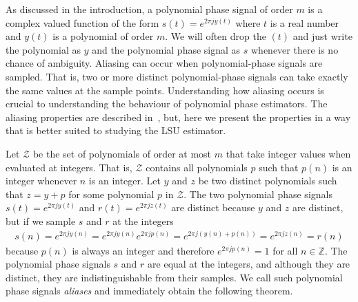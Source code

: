 \documentclass[aap,preprint]{imsart}
\newcommand{\ints}{{\mathbb Z}}
\newcommand{\term}{\emph}
\begin{document}
As discussed in the introduction, a polynomial phase signal of order $m$ is a complex valued function of the form $s(t) = e^{2\pi j y(t)}$ where $t$ is a real number and $y(t)$ is a polynomial of order $m$. We will often drop the $(t)$ and just write the polynomial as $y$ and the polynomial phase signal as $s$ whenever there is no chance of ambiguity. %
Aliasing can occur when polynomial-phase signals are sampled.  That is, two or more distinct polynomial-phase signals can take exactly the same values at the sample points.  Understanding how aliasing occurs is crucial to understanding the behaviour of polynomial phase estimators.  The aliasing properties are described in~\cite{McKilliam2009IndentifiabliltyAliasingPolyphase}, but, here we present the properties in a way that is better suited to studying the LSU estimator.  %

Let $\mathcal{Z}$ be the set of polynomials of order at most $m$ that take integer values when evaluated at integers. That is, $\mathcal{Z}$ contains all polynomials $p$ such that $p(n)$ is an integer whenever $n$ is an integer.
Let $y$ and $z$ be two distinct polynomials such that $z = y + p$ for some polynomial $p$ in $\mathcal{Z}$. The two polynomial phase signals $s(t) = e^{2\pi j y(t)}$ and $r(t) = e^{2\pi j z(t)}$ are distinct because $y$ and $z$ are distinct, but if we sample $s$ and $r$ at the integers  
\begin{align*}
s(n) = e^{2\pi j y(n)} =  e^{2\pi j y(n)} e^{2\pi j p(n)} = e^{2\pi j (y(n) + p(n))} = e^{2\pi j z(n)} = r(n)
\end{align*}
because $p(n)$ is always an integer and therefore $e^{2\pi j p(n)} = 1$ for all $n \in \ints$. The polynomial phase signals $s$ and $r$ are equal at the integers, and although they are distinct, they are indistinguishable from their samples. We call such polynomial phase signals \term{aliases} and immediately obtain the following theorem.
\end{document}
